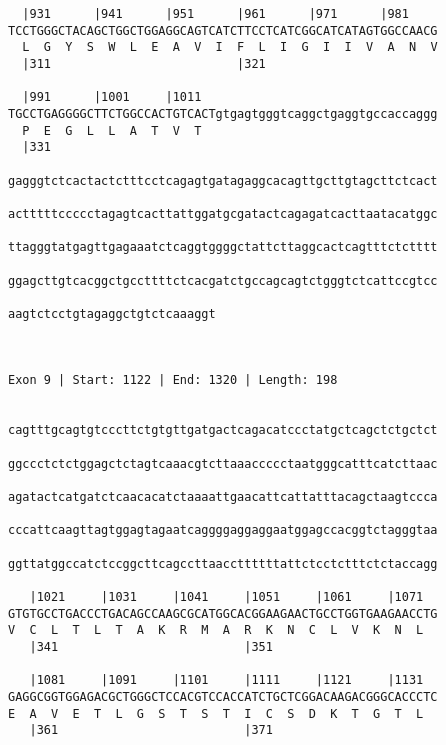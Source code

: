\documentclass{article}
\begin{document}
\begin{Verbatim}
  |931      |941      |951      |961      |971      |981    
TCCTGGGCTACAGCTGGCTGGAGGCAGTCATCTTCCTCATCGGCATCATAGTGGCCAACG
  L  G  Y  S  W  L  E  A  V  I  F  L  I  G  I  I  V  A  N  V
  |311                          |321                        
  
  |991      |1001     |1011                                 
TGCCTGAGGGGCTTCTGGCCACTGTCACTgtgagtgggtcaggctgaggtgccaccaggg
  P  E  G  L  L  A  T  V  T                                 
  |331                                                      
  
gagggtctcactactctttcctcagagtgatagaggcacagttgcttgtagcttctcact
                                                            
actttttccccctagagtcacttattggatgcgatactcagagatcacttaatacatggc
                                                            
ttagggtatgagttgagaaatctcaggtggggctattcttaggcactcagtttctctttt
                                                            
ggagcttgtcacggctgccttttctcacgatctgccagcagtctgggtctcattccgtcc
                                                            
aagtctcctgtagaggctgtctcaaaggt
                             
                             
 
Exon 9 | Start: 1122 | End: 1320 | Length: 198


cagtttgcagtgtcccttctgtgttgatgactcagacatccctatgctcagctctgctct
                                                            
ggccctctctggagctctagtcaaacgtcttaaaccccctaatgggcatttcatcttaac
                                                            
agatactcatgatctcaacacatctaaaattgaacattcattatttacagctaagtccca
                                                            
cccattcaagttagtggagtagaatcaggggaggaggaatggagccacggtctagggtaa
                                                            
ggttatggccatctccggcttcagccttaaccttttttattctcctctttctctaccagg
                                                            
   |1021     |1031     |1041     |1051     |1061     |1071  
GTGTGCCTGACCCTGACAGCCAAGCGCATGGCACGGAAGAACTGCCTGGTGAAGAACCTG
V  C  L  T  L  T  A  K  R  M  A  R  K  N  C  L  V  K  N  L  
   |341                          |351                       
  
   |1081     |1091     |1101     |1111     |1121     |1131  
GAGGCGGTGGAGACGCTGGGCTCCACGTCCACCATCTGCTCGGACAAGACGGGCACCCTC
E  A  V  E  T  L  G  S  T  S  T  I  C  S  D  K  T  G  T  L  
   |361                          |371                       
  

\end{Verbatim}
\end{document}
